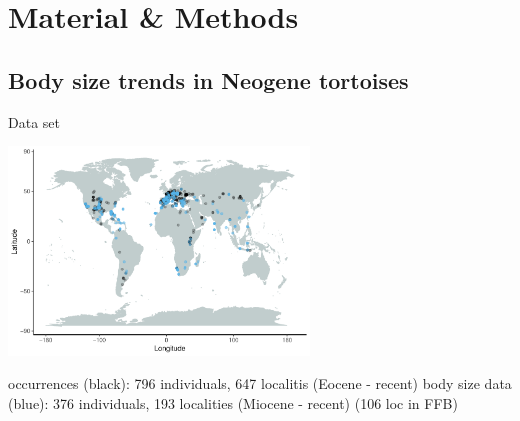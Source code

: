 \section{Material \& Methods}

\subsection{Body size trends in Neogene tortoises}

\begin{frame}{Data set}
\begin{center}
	\includegraphics[width=0.6\textwidth]{MA_JJ_files/figure-latex/MapFossilOccurrences-1.pdf}
\end{center}


\begin{itemize} %
 occurrences (black): 796 individuals, 647 localitis (Eocene - recent)
\bigskip
{} body size data (blue): 376 individuals, 193 localities (Miocene - recent) (106 loc in FFB)
\end{itemize}

\end{frame}


